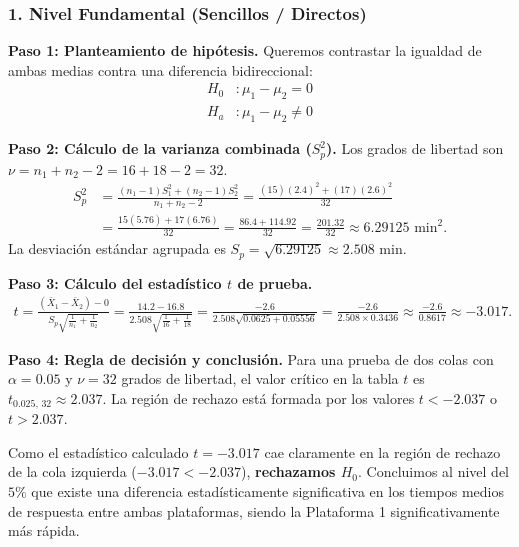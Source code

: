 \subsubsection*{1. Nivel Fundamental (Sencillos / Directos)}

\begin{solproblema}
	\textbf{Paso 1: Planteamiento de hipótesis.}
	Queremos contrastar la igualdad de ambas medias contra una diferencia bidireccional:
	\begin{align}
		H_0&: \mu_1 - \mu_2 = 0 \\
		H_a&: \mu_1 - \mu_2 \neq 0
	\end{align}
	
	\textbf{Paso 2: Cálculo de la varianza combinada ($S_p^2$).}
	Los grados de libertad son $\nu = n_1 + n_2 - 2 = 16 + 18 - 2 = 32$.
	\begin{align}
		S_p^2 &= \frac{(n_1 - 1)S_1^2 + (n_2 - 1)S_2^2}{n_1 + n_2 - 2} = \frac{(15)(2.4)^2 + (17)(2.6)^2}{32} \\
		&= \frac{15(5.76) + 17(6.76)}{32} = \frac{86.4 + 114.92}{32} = \frac{201.32}{32} \approx 6.29125 \text{ min}^2.
	\end{align}
	La desviación estándar agrupada es $S_p = \sqrt{6.29125} \approx 2.508$ min.
	
	\textbf{Paso 3: Cálculo del estadístico $t$ de prueba.}
	\begin{align}
		t = \frac{(\bar{X}_1 - \bar{X}_2) - 0}{S_p \sqrt{\frac{1}{n_1} + \frac{1}{n_2}}} = \frac{14.2 - 16.8}{2.508 \sqrt{\frac{1}{16} + \frac{1}{18}}} = \frac{-2.6}{2.508 \sqrt{0.0625 + 0.05556}} = \frac{-2.6}{2.508 \times 0.3436} \approx \frac{-2.6}{0.8617} \approx -3.017.
	\end{align}
	
	\textbf{Paso 4: Regla de decisión y conclusión.}
	Para una prueba de dos colas con $\alpha = 0.05$ y $\nu = 32$ grados de libertad, el valor crítico en la tabla $t$ es $t_{0.025, \, 32} \approx 2.037$.
	La región de rechazo está formada por los valores $t < -2.037$ o $t > 2.037$.
	
	Como el estadístico calculado $t = -3.017$ cae claramente en la región de rechazo de la cola izquierda ($-3.017 < -2.037$), \textbf{rechazamos $H_0$}. Concluimos al nivel del $5\%$ que existe una diferencia estadísticamente significativa en los tiempos medios de respuesta entre ambas plataformas, siendo la Plataforma 1 significativamente más rápida.
\end{solproblema}

